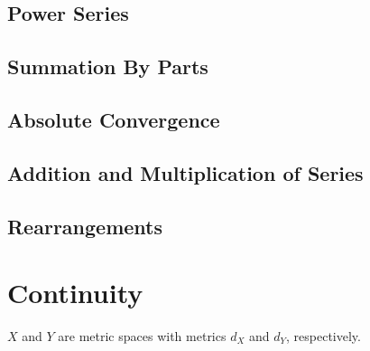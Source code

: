 \documentclass[a4paper,12pt]{report}
\theoremstyle{plain}
\theoremstyle{definition}
\theoremstyle{remark}
\begin{document}
\section{Power Series}

\section{Summation By Parts}

\section{Absolute Convergence}

\section{Addition and Multiplication of Series}

\section{Rearrangements}

\chapter{Continuity}
$X$ and $Y$ are metric spaces with metrics $d_X$ and $d_Y$, respectively.
\end{document}
